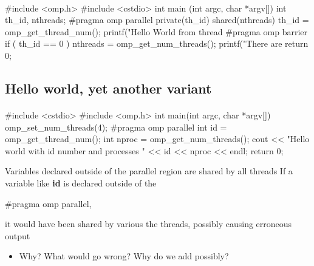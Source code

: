 \documentclass[%
oneside,                 %
final,                   %
10pt]{article}
\begin{document}
\paragraph{}


















\bcppcod
#include <omp.h>
#include <cstdio>
int main (int argc, char *argv[])
{
int th_id, nthreads;
#pragma omp parallel private(th_id) shared(nthreads)
{
th_id = omp_get_thread_num();
printf("Hello World from thread %
#pragma omp barrier
if ( th_id == 0 ) {
nthreads = omp_get_num_threads();
printf("There are %
}
}
return 0;
}

\ecppcod



\subsection{Hello world, yet another variant}

\paragraph{}














\bcppcod
#include <cstdio>
#include <omp.h>
int main(int argc, char *argv[]) 
{
 omp_set_num_threads(4); 
#pragma omp parallel
 {
   int id = omp_get_thread_num();
   int nproc = omp_get_num_threads(); 
   cout << "Hello world with id number and processes " <<  id <<  nproc << endl;
 } 
return 0;
}

\ecppcod

Variables declared outside of the parallel region are shared by all threads
If a variable like \textbf{id} is  declared outside of the 


\bcppcod
#pragma omp parallel, 

\ecppcod

it would have been shared by various the threads, possibly causing erroneous output
\begin{itemize}
 \item Why? What would go wrong? Why do we add  possibly?
\end{itemize}
\end{document}
